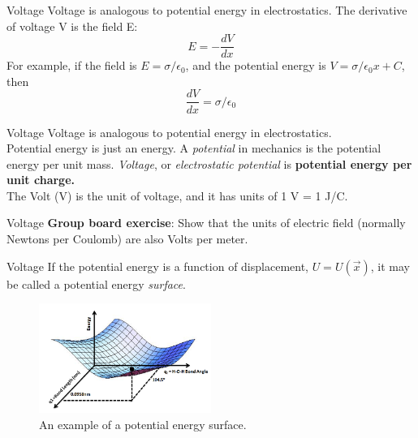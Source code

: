 \documentclass{beamer}
\begin{document}
\begin{frame}{Voltage}
\alert{Voltage} is analogous to potential energy in electrostatics.  The derivative of voltage V is the field E:
\begin{equation}
E = -\frac{dV}{dx}
\end{equation}
For example, if the field is $E = \sigma/\epsilon_0$, and the potential energy is $V = \sigma/\epsilon_0 x + C$, then 
\begin{equation}
\frac{dV}{dx} = \sigma/\epsilon_0
\end{equation}
\end{frame}

\begin{frame}{Voltage}
\alert{Voltage} is analogous to potential energy in electrostatics. \\ \vspace{1cm}
Potential energy is just an energy.  A \textit{potential} in mechanics is the potential energy per unit mass.  \textit{Voltage}, or \textit{electrostatic potential} is \textbf{\alert{potential energy per unit charge.}} \\ 
The Volt (V) is the unit of voltage, and it has units of 1 V = 1 J/C.
\end{frame}

\begin{frame}{Voltage}
\textbf{Group board exercise}: Show that the units of electric field (normally Newtons per Coulomb) are also Volts per meter.
\end{frame}

\begin{frame}{Voltage}
\small
If the potential energy is a function of displacement, $U = U(\vec{x})$, it may be called a potential energy \textit{surface}.
\begin{figure}
\centering
\includegraphics[width=0.5\textwidth]{figures/potential.png}
\caption{\label{fig:potential} An example of a potential energy surface.}
\end{figure}
\end{frame}
\end{document}
